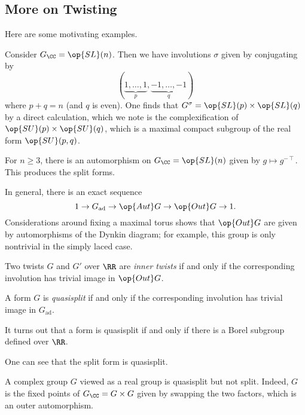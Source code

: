 \documentclass[../notes.tex]{subfiles}
\begin{document}
\subsection{More on Twisting}
Here are some motivating examples.
\begin{example}
	Consider $G_\CC=\op{SL}(n)$. Then we have involutions $\sigma$ given by conjugating by
	\[(\underbrace{1,\ldots,1}_p,\underbrace{-1,\ldots,-1}_q)\]
	where $p+q=n$ (and $q$ is even). One finds that $G^\sigma=\op{SL}(p)\times\op{SL}(q)$ by a direct calculation, which we note is the complexification of $\op{SU}(p)\times\op{SU}(q)$, which is a maximal compact subgroup of the real form $\op{SU}(p,q)$.
\end{example}
\begin{example}
	For $n\ge3$, there is an automorphism on $G_\CC=\op{SL}(n)$ given by $g\mapsto g^{-\intercal}$. This produces the split forms.
\end{example}
\begin{remark}
	In general, there is an exact sequence
	\[1\to G_{\mathrm{ad}}\to\op{Aut}G\to\op{Out}G\to1.\]
	Considerations around fixing a maximal torus shows that $\op{Out}G$ are given by automorphisms of the Dynkin diagram; for example, this group is only nontrivial in the simply laced case.
\end{remark}
\begin{definition}
	Two twists $G$ and $G'$ over $\RR$ are \textit{inner twists} if and only if the corresponding involution has trivial image in $\op{Out}G$.
\end{definition}
\begin{definition}[quasisplit]
	A form $G$ is \textit{quasisplit} if and only if the corresponding involution has trivial image in $G_{\mathrm{ad}}$.
\end{definition}
\begin{remark}
	It turns out that a form is quasisplit if and only if there is a Borel subgroup defined over $\RR$.
\end{remark}
\begin{example}
	One can see that the split form is quasisplit.
\end{example}
\begin{example}
	A complex group $G$ viewed as a real group is quasisplit but not split. Indeed, $G$ is the fixed points of $G_\CC= G\times G$ given by swapping the two factors, which is an outer automorphism.
\end{example}
\end{document}
